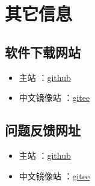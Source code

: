 \chapter{其它信息}

\section{软件下载网站}

\begin{itemize}
    \item 主站 ：\href{https://github.com/Joe-zhouman/multimeter-public/releases}{github}  
    \item 中文镜像站 ：\href{https://gitee.com/Joe-zhouman/multimeter-public/releases}{gitee}  
\end{itemize}

\section{问题反馈网址}

\begin{itemize}
    \item 主站 ：\href{https://github.com/Joe-zhouman/multimeter-public/issues}{github}  
    \item 中文镜像站 ：\href{https://gitee.com/Joe-zhouman/multimeter-public/issues}{gitee}  
\end{itemize}
